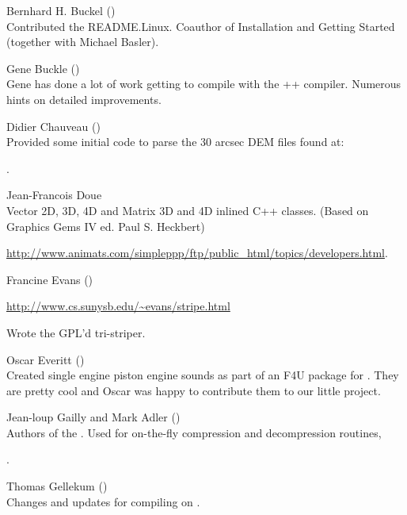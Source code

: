 \noindent Bernhard H. Buckel
()\\
  Contributed the README.Linux.  Coauthor of Installation
  and Getting Started (together with Michael Basler).
 \medskip

\noindent Gene Buckle ()\\
  Gene has done a lot of work getting \FlightGear to compile with the ++
  compiler. Numerous hints on detailed improvements.
 \medskip

\noindent Didier Chauveau ()\\
  Provided some initial code to parse the 30 arcsec DEM files found at:

  .
 \medskip


\noindent Jean-Francois Doue\\
  Vector 2D, 3D, 4D and Matrix 3D and 4D inlined C++ classes.  (Based on
  Graphics Gems IV ed. Paul S. Heckbert)

\href{http://www.animats.com/simpleppp/ftp/public_html/topics/developers.html}{http://www.animats.com/simpleppp/ftp/public\_html/topics/developers.html}.
 \medskip

\noindent Francine Evans ()

\href{http://www.cs.sunysb.edu/~evans/stripe.html}{http://www.cs.sunysb.edu/\~{}evans/stripe.html}

  \noindent
  Wrote the GPL'd tri-striper.
 \medskip

\noindent Oscar Everitt ()\\
  Created single engine piston engine sounds as part of an F4U package
  for .  They are pretty cool and Oscar was happy to contribute
  them to our little project.
 \medskip

\noindent Jean-loup Gailly and Mark Adler
()\\
  Authors of the .  Used for on-the-fly compression and
  decompression routines,

  .
 \medskip

\noindent Thomas Gellekum ()\\
  Changes and updates for compiling on .
 \medskip

